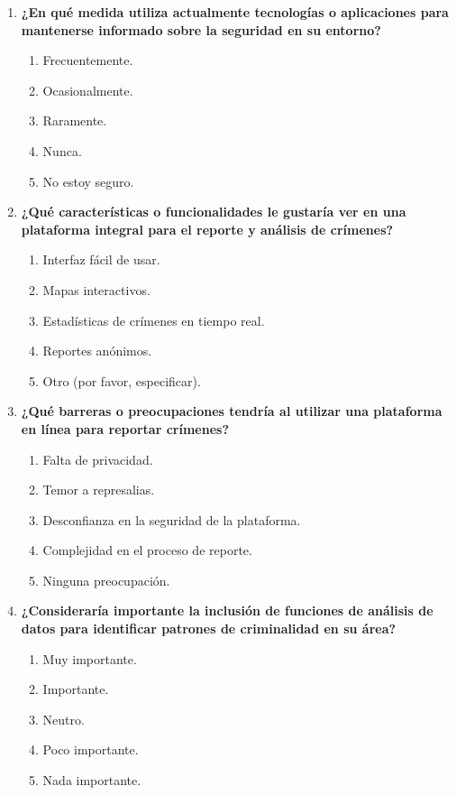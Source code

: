 \documentclass{article}
\begin{document}
\begin{enumerate}[label=\arabic*.]
            \item \textbf{¿En qué medida utiliza actualmente tecnologías o aplicaciones para mantenerse informado sobre la seguridad en su entorno?}
                \begin{enumerate}[label=\alph*.]
                    \item Frecuentemente.
                    \item Ocasionalmente.
                    \item Raramente.
                    \item Nunca.
                    \item No estoy seguro.
                \end{enumerate}

            \item \textbf{¿Qué características o funcionalidades le gustaría ver en una plataforma integral para el reporte y análisis de crímenes?}
                \begin{enumerate}[label=\alph*.]
                    \item Interfaz fácil de usar.
                    \item Mapas interactivos.
                    \item Estadísticas de crímenes en tiempo real.
                    \item Reportes anónimos.
                    \item Otro (por favor, especificar).
                \end{enumerate}

            \item \textbf{¿Qué barreras o preocupaciones tendría al utilizar una plataforma en línea para reportar crímenes?}
                \begin{enumerate}[label=\alph*.]
                    \item Falta de privacidad.
                    \item Temor a represalias.
                    \item Desconfianza en la seguridad de la plataforma.
                    \item Complejidad en el proceso de reporte.
                    \item Ninguna preocupación.
                \end{enumerate}

            \item \textbf{¿Consideraría importante la inclusión de funciones de análisis de datos para identificar patrones de criminalidad en su área?}
                \begin{enumerate}[label=\alph*.]
                    \item Muy importante.
                    \item Importante.
                    \item Neutro.
                    \item Poco importante.
                    \item Nada importante.
                \end{enumerate}


\end{enumerate}
\end{document}
